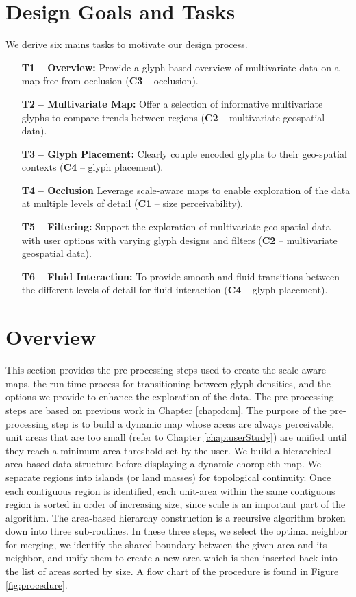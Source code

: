 \section{Design Goals and Tasks} \label{sec:tasks}
We derive six mains tasks to motivate our design process. 

\begin{itemize}[labelindent=0em, labelsep=0.1cm, leftmargin=*]
\item[\textbf{T1}]\textbf{-- Overview:} Provide a glyph-based overview of multivariate data on a map free from occlusion (\textbf{C3} -- occlusion).
\item[\textbf{T2}]\textbf{-- Multivariate Map:} Offer a selection of informative multivariate glyphs to compare trends between regions (\textbf{C2} -- multivariate geospatial data).
\item[\textbf{T3}]\textbf{-- Glyph Placement:} Clearly couple encoded glyphs to their geo-spatial contexts (\textbf{C4} -- glyph placement).
\item[\textbf{T4}]\textbf{-- Occlusion} Leverage scale-aware maps to enable exploration of the data at multiple levels of detail (\textbf{C1} -- size perceivability).
\item[\textbf{T5}]\textbf{-- Filtering:} Support the exploration of multivariate geo-spatial data with user options with varying glyph designs and filters (\textbf{C2} -- multivariate geospatial data).
\item[\textbf{T6}]\textbf{-- Fluid Interaction:} To provide smooth and fluid transitions between the different levels of detail for fluid interaction (\textbf{C4} -- glyph placement).
\end{itemize}
\section{Overview}
This section provides the pre-processing steps used to create the scale-aware maps, the run-time process for transitioning between glyph densities, and the options we provide to enhance the exploration of the data. The pre-processing steps are based on previous work in Chapter \ref{chap:dcm}. The purpose of the pre-processing step is to build a dynamic map whose areas are always perceivable, unit areas that are too small (refer to Chapter \ref{chap:userStudy}) are unified until they reach a minimum area threshold set by the user. We build a hierarchical area-based data structure before displaying a dynamic choropleth map.
We separate regions into islands (or land masses) for topological continuity. Once each contiguous region is identified, each unit-area within the same contiguous region is sorted in order of increasing size, since scale is an important part of the algorithm. The area-based hierarchy construction is a recursive algorithm broken down into three sub-routines. In these three steps, we select the optimal neighbor for merging, we identify the shared boundary between the given area and its neighbor, and unify them to create a new area which is then inserted back into the list of areas sorted by size. A flow chart of the procedure is found in Figure \ref{fig:procedure}.

